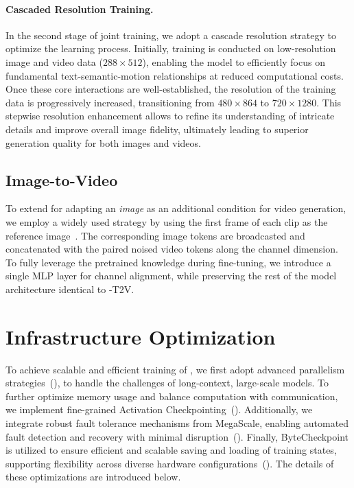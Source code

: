 \paragraph{Cascaded Resolution Training.} In the second stage of joint training, we adopt a cascade resolution strategy to optimize the learning process. Initially, training is conducted on low-resolution image and video data ($288\times512$), enabling the model to efficiently focus on fundamental text-semantic-motion relationships at reduced computational costs. Once these core interactions are well-established, the resolution of the training data is progressively increased, transitioning from $480\times864$ to $720\times1280$. This stepwise resolution enhancement allows \ours to refine its understanding of intricate details and improve overall image fidelity, ultimately leading to superior generation quality for both images and videos.


\subsection{Image-to-Video}
To extend \ours for adapting an \emph{image} as an additional condition for video generation, we employ a widely used strategy by using the first frame of each clip as the reference image~\citep{girdhar2023emu, blattmann2023stable, yang2024cogvideox}. The corresponding image tokens are broadcasted and concatenated with the paired noised video tokens along the channel dimension. To fully leverage the pretrained knowledge during fine-tuning, we introduce a single MLP layer for channel alignment, while preserving the rest of the model architecture identical to \ours-T2V.


\section{Infrastructure Optimization} 

To achieve scalable and efficient training of \ours, we first adopt advanced parallelism strategies~(), to handle the challenges of long-context, large-scale models. To further optimize memory usage and balance computation with communication, we implement fine-grained Activation Checkpointing~(). Additionally, we integrate robust fault tolerance mechanisms from MegaScale, enabling automated fault detection and recovery with minimal disruption~(). Finally, ByteCheckpoint is utilized to ensure efficient and scalable saving and loading of training states, supporting flexibility across diverse hardware configurations~(). The details of these optimizations are introduced below.

